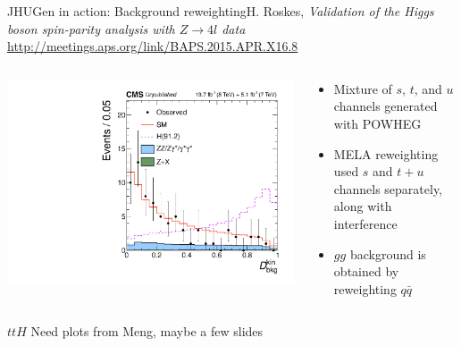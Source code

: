\documentclass[usenames,dvipsnames,svgnames,table]{beamer}
\begin{document}
\begin{frame}{JHUGen in action: Background reweighting}{H. Roskes, \emph{Validation of the Higgs boson spin-parity
analysis with $Z\to 4l$ data}\\ \url{http://meetings.aps.org/link/BAPS.2015.APR.X16.8}}
\begin{columns}
\begin{column}{0.55\textwidth}
\includegraphics[width=.5\columnwidth]{HVV/Z4lDbkgkin}
\end{column}
\begin{column}{0.45\textwidth}
\begin{itemize}
\item Mixture of $s$, $t$, and $u$ channels generated with POWHEG
\item MELA reweighting used $s$ and $t+u$ channels separately, along with interference
\item $gg$ background is obtained by reweighting $q\bar{q}$
\end{itemize}
\end{column}
\end{columns}
\end{frame}

\begin{frame}{$ttH$}
Need plots from Meng, maybe a few slides
\end{frame}
\end{document}
